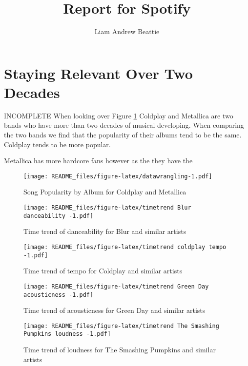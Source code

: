 \documentclass[
]{article}
\title{Report for Spotify}
\author{Liam Andrew Beattie}
\date{}
\begin{document}
\maketitle

\section{Staying Relevant Over Two
Decades}\label{staying-relevant-over-two-decades}

INCOMPLETE When looking over Figure \ref{coldplaymet} Coldplay and
Metallica are two bands who have more than two decades of musical
developing. When comparing the two bands we find that the popularity of
their albums tend to be the same. Coldplay tends to be more popular.

Metallica has more hardcore fans however as the they have the

\begin{figure}
\centering
\texttt{[image: README\_files/figure-latex/datawrangling-1.pdf]}
\caption{Song Popularity by Album for Coldplay and
Metallica\label{coldplaymet}}
\end{figure}

\begin{figure}
\centering
\texttt{[image: README\_files/figure-latex/timetrend Blur danceability -1.pdf]}
\caption{Time trend of danceability for Blur and similar artists}
\end{figure}

\begin{figure}
\centering
\texttt{[image: README\_files/figure-latex/timetrend coldplay tempo -1.pdf]}
\caption{Time trend of tempo for Coldplay and similar artists}
\end{figure}

\begin{figure}
\centering
\texttt{[image: README\_files/figure-latex/timetrend Green Day acousticness -1.pdf]}
\caption{Time trend of acousticness for Green Day and similar artists}
\end{figure}

\begin{figure}
\centering
\texttt{[image: README\_files/figure-latex/timetrend The Smashing Pumpkins loudness -1.pdf]}
\caption{Time trend of loudness for The Smashing Pumpkins and similar
artists}
\end{figure}
\end{document}
